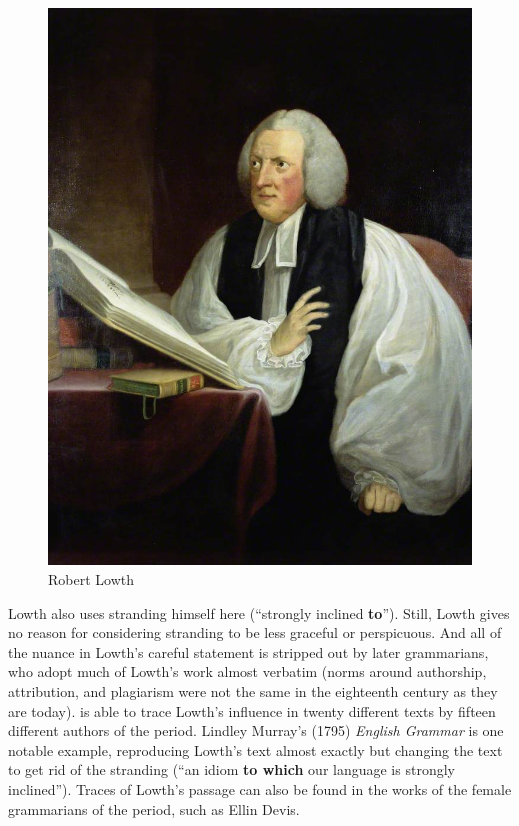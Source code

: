 \begin{figure}
        \includegraphics[scale=0.17]{chapters/img/Robert_Lowth_portrait.jpg}
    \caption{Robert Lowth}
    \label{fig:Lowth}
\end{figure}

\hspace*{-5pt}Lowth also uses stranding himself here (``strongly inclined \textbf{to}''). Still, Lowth gives no reason for considering stranding to be less graceful or perspicuous. And all of the nuance in Lowth's careful statement is stripped out by later grammarians, who adopt much of Lowth's work almost verbatim (norms around authorship, attribution, and plagiarism were not the same in the eighteenth century as they are today). \citet[218]{YanezBouza2015} is able to trace Lowth's influence in twenty different texts by fifteen different authors of the period. Lindley Murray's (1795) \textit{English Grammar} is one notable example, reproducing Lowth's text almost exactly but changing the text to get rid of the stranding (``an idiom \textbf{to which} our language is strongly inclined''). Traces of Lowth's passage can also be found in the works of the female grammarians of the period, such as Ellin Devis.

